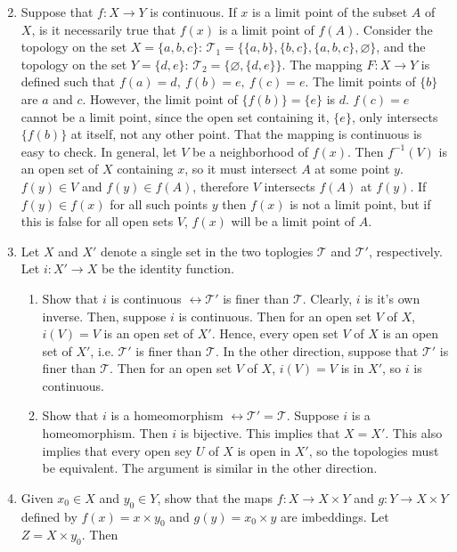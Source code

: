 \documentclass[12pt,letterpaper]{article}
\newcommand{\n}{\break}
\let\emptyset\varnothing
\newcommand{\T}{\ensuremath{\mathcal{T}}}
\begin{document}
\RaggedRight
\begin{enumerate}
  \setcounter{enumi}{1}
\item Suppose that $f: X\rightarrow Y$ is continuous. If $x$ is a limit point of the subset $A$ of $X$, is it necessarily true that $f(x)$ is a limit point of $f(A)$.\n
\indent Consider the topology on the set $X=\{a,b,c\}$: $\T_1 = \{\{a,b\}, \{b,c\},\{a,b,c\},\emptyset\}$, and the topology on the set $Y=\{d,e\}$: $\T_2 = \{\emptyset, \{d,e\}\}$. The mapping $F: X\rightarrow Y$ is defined such that $f(a)=d,\ f(b)=e,\ f(c)=e$. The limit points of $\{b\}$ are $a$ and $c$. However, the limit point of $\{f(b)\}=\{e\}$ is $d$. $f(c)=e$ cannot be a limit point, since the open set containing it, $\{e\}$, only intersects $\{f(b)\}$ at itself, not any other point. That the mapping is continuous is easy to check.\n
\indent In general, let $V$ be a neighborhood of $f(x)$. Then $f^{-1}(V)$ is an open set of $X$ containing $x$, so it must intersect $A$ at some point $y$. $f(y)\in V$ and $f(y)\in f(A)$, therefore $V$ intersects $f(A)$ at $f(y)$. If $f(y)\in f(x)$ for all such points $y$ then $f(x)$ is not a limit point, but if this is false for all open sets $V$, $f(x)$ will be a limit point of $A$.
\item Let $X$ and $X'$ denote a single set in the two toplogies $\T$ and $\T'$, respectively. Let $i: X'\rightarrow X$ be the identity function.
  \begin{enumerate}
  \item Show that $i$ is continuous $\leftrightarrow \T'$ is finer than $\T$.\hspace{5in}\n
    \indent Clearly, $i$ is it's own inverse. Then, suppose $i$ is continuous. Then for an open set $V$ of $X$, $i(V)=V$ is an open set of $X'$. Hence, every open set $V$ of $X$ is an open set of $X'$, i.e. $\T'$ is finer than $\T$. \n
    \indent In the other direction, suppose that $\T'$ is finer than $\T$. Then for an open set $V$ of $X$, $i(V)=V$ is in $X'$, so $i$ is continuous.
  \item Show that $i$ is a homeomorphism $\leftrightarrow \T'=\T$.\n
    \indent Suppose $i$ is a homeomorphism. Then $i$ is bijective. This implies that $X=X'$. This also implies that every open sey $U$ of $X$ is open in $X'$, so the topologies must be equivalent. The argument is similar in the other direction.
  \end{enumerate}
\item Given $x_0\in X$ and $y_0\in Y$, show that the maps $f: X\rightarrow X\times Y$ and $g: Y\rightarrow X\times Y$ defined by $f(x)=x\times y_0$ and $g(y)=x_0\times y$ are imbeddings. Let $Z=X\times y_0$. Then 
\end{enumerate}
\end{document}
